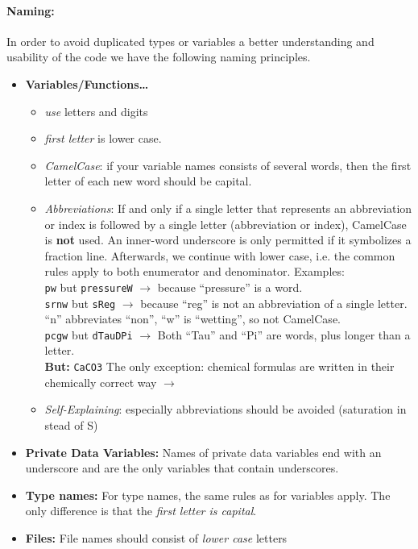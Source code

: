 \paragraph{Naming:}
In order to avoid duplicated types or variables a better understanding and usability
of the code we have the following naming principles.
\begin{itemize}
\item \textbf{Variables/Functions\ldots}
  \begin{itemize}
  \item \emph{use} letters and digits
  \item \emph{first letter} is lower case.
  \item \emph{CamelCase}: if your variable names consists of several words, then 
        the first letter of each new word should be capital.
  \item \emph{Abbreviations}: If and only if a single letter that represents an
         abbreviation or index is followed by a single letter (abbreviation or index),
         CamelCase is {\bf not} used. An inner-word underscore is only permitted if
         it symbolizes a fraction line. Afterwards, we continue with lower case, i.e.
         the common rules apply to both enumerator and denominator. Examples: \\
         \texttt{pw} but \texttt{pressureW} $\rightarrow$ because ``pressure'' is a word.\\
         \texttt{srnw} but \texttt{sReg} $\rightarrow$ because ``reg'' is not an abbreviation of a single letter. ``n'' abbreviates ``non'', ``w'' is ``wetting'', so not CamelCase.\\
         \texttt{pcgw} but \texttt{dTauDPi} $\rightarrow$ Both ``Tau'' and ``Pi'' are words, plus longer than a letter.\\
         \textbf{But:} \texttt{CaCO3} The only exception: chemical formulas are written in their chemically correct way $\rightarrow$
  \item \emph{Self-Explaining}: especially abbreviations should be avoided (saturation in stead of S)
  \end{itemize}
\item \textbf{Private Data Variables:} Names of private data variables end with an 
      underscore and are the only variables that contain underscores.
\item \textbf{Type names:} For type names, the same rules as for variables apply. The 
      only difference is that the \emph{first letter is capital}.
\item \textbf{Files:} File names should consist of \emph{lower case} letters

\end{itemize}
